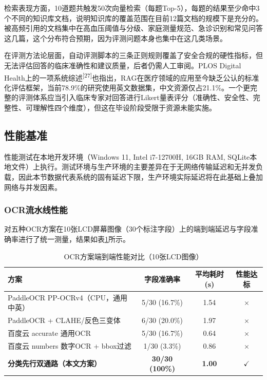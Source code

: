 \documentclass[zihao=-4,a4paper]{ctexart}
\numberwithin{figure}{section}
\numberwithin{table}{section}
\begin{document}
检索表现方面，10道题共触发50次向量检索（每题Top-5），每题的结果至少命中3个不同的知识库文档，说明知识库的覆盖范围在目前12篇文档的规模下是充分的。被高频引用的文档集中在高血压阈值与分级、家庭测量规范、急诊识别和常见问答这几篇，这个分布符合预期，因为评测问题本身也集中在这几类场景。

在评测方法论层面，自动评测脚本的三条正则规则覆盖了安全合规的硬性指标，但无法评估回答的临床准确性和建议质量，后者仍需人工审阅。PLOS Digital Health上的一项系统综述\textsuperscript{[27]}也指出，RAG在医疗领域的应用至今缺乏公认的标准化评估框架，当前78.9\%的研究使用英文数据集，中文资源仅占21.1\%。一个更完整的评测体系应当引入临床专家对回答进行Likert量表评分（准确性、安全性、完整性、可理解性四个维度），但这在毕设阶段受限于资源未能实施。

\subsection{性能基准}

性能测试在本地开发环境（Windows 11, Intel i7-12700H, 16GB RAM, SQLite本地文件）上执行。测试环境与生产环境的主要差异在于无网络传输延迟和无并发负载，因此本节数据代表系统的固有延迟下限，生产环境实际延迟将在此基础上叠加网络与并发因素。

\subsubsection{OCR流水线性能}

对五种OCR方案在10张LCD屏幕图像（30个标注字段）上的端到端延迟与字段准确率进行了统一测量，结果如表\ref{tab:perf-ocr}所示。

\begin{table}[H]
\centering
\caption{OCR方案端到端性能对比（10张LCD图像）}
\label{tab:perf-ocr}
\begin{tabular}{lccc}
\toprule
\textbf{方案} & \textbf{字段准确率} & \textbf{平均耗时(s)} & \textbf{性能达标} \\
\midrule
PaddleOCR PP-OCRv4（CPU，通用中英） & 5/30 (16.7\%) & 1.54 & $\times$ \\
PaddleOCR + CLAHE/反色三变体 & 6/30 (20.0\%) & 1.97 & $\times$ \\
百度云 accurate 通用OCR & 5/30 (16.7\%) & 0.64 & $\times$ \\
百度云 numbers 数字OCR + bbox过滤 & 1/30 (3.3\%) & 0.86 & $\times$ \\
\textbf{分类先行双通路（本文方案）} & \textbf{30/30 (100\%)} & \textbf{1.00} & $\checkmark$ \\
\bottomrule
\end{tabular}
\end{table}
\end{document}

